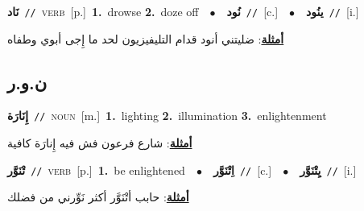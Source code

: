\documentclass[10pt,a4paper,twoside]{article} %
\begin{document}
\begin{multicols}{2}
{\setlength\topsep{0pt}\textbf{\foreignlanguage{arabic}{نَاد}}\ {\color{gray}\texttt{//}\color{black}}\ \textsc{verb}\ [p.]\ \textbf{1.}~drowse  \textbf{2.}~doze off\ \ $\bullet$\ \ \setlength\topsep{0pt}\textbf{\foreignlanguage{arabic}{نُود}}\ {\color{gray}\texttt{//}\color{black}}\ [c.]\ \ $\bullet$\ \ \setlength\topsep{0pt}\textbf{\foreignlanguage{arabic}{ينُود}}\ {\color{gray}\texttt{//}\color{black}}\ [i.]\  \begin{flushright}\color{gray}\foreignlanguage{arabic}{\textbf{\underline{\foreignlanguage{arabic}{أمثلة}}}: ضليتني أنود قدام التليفيزيون  لحد ما إِجى أبوي وطفاه}\end{flushright}\color{black}} \vspace{2mm}

\vspace{-3mm}
\subsection*{\color{blue}\foreignlanguage{arabic}{ن.و.ر}\color{blue}{}} 

{\setlength\topsep{0pt}\textbf{\foreignlanguage{arabic}{إِنَارَة}}\ {\color{gray}\texttt{//}\color{black}}\ \textsc{noun}\ [m.]\ \textbf{1.}~lighting  \textbf{2.}~illumination  \textbf{3.}~enlightenment\  \begin{flushright}\color{gray}\foreignlanguage{arabic}{\textbf{\underline{\foreignlanguage{arabic}{أمثلة}}}: شارع فرعون فش فيه إِنارَة كافية}\end{flushright}\color{black}} \vspace{2mm}

{\setlength\topsep{0pt}\textbf{\foreignlanguage{arabic}{تْنَوَّر}}\ {\color{gray}\texttt{//}\color{black}}\ \textsc{verb}\ [p.]\ \textbf{1.}~be enlightened\ \ $\bullet$\ \ \setlength\topsep{0pt}\textbf{\foreignlanguage{arabic}{اِتْنَوَّر}}\ {\color{gray}\texttt{//}\color{black}}\ [c.]\ \ $\bullet$\ \ \setlength\topsep{0pt}\textbf{\foreignlanguage{arabic}{يِتْنَوَّر}}\ {\color{gray}\texttt{//}\color{black}}\ [i.]\  \begin{flushright}\color{gray}\foreignlanguage{arabic}{\textbf{\underline{\foreignlanguage{arabic}{أمثلة}}}: حابب أتْنَوَّر أكثر نَوِّرني من فضلك}\end{flushright}\color{black}} \vspace{2mm}


\end{multicols}
\end{document}
